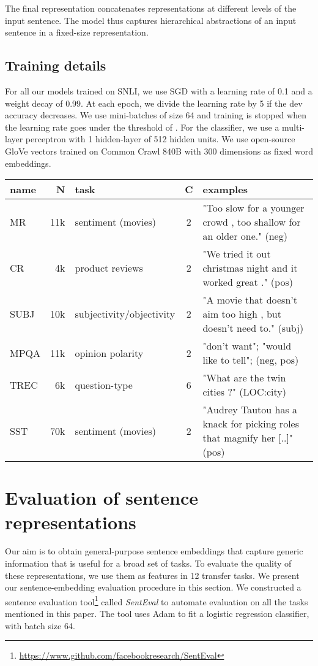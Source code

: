 \documentclass[11pt,letterpaper]{article}
\begin{document}
The final representation  concatenates representations at different levels of the input sentence. The model thus captures hierarchical abstractions of an input sentence in a fixed-size representation.

\subsection{Training details}
For all our models trained on SNLI, we use SGD with a learning rate of 0.1 and a weight decay of 0.99. At each epoch, we divide the learning rate by 5 if the dev accuracy decreases. We use mini-batches of size 64 and training is stopped when the learning rate goes under the threshold of . For the classifier, we use a multi-layer perceptron with 1 hidden-layer of 512 hidden units. We use open-source GloVe vectors trained on Common Crawl 840B with 300 dimensions as fixed word embeddings.

\begin{table*}[h!]
{\small
\centering
\begin{tabular}{|l|r|l|c|p{9.2cm}|}
\hline \bf name & \bf N & \bf task & \bf C & \bf examples \\
\hline
MR & 11k &  sentiment (movies) & 2 &  "Too slow for a younger crowd , too shallow for an older one." (neg)\\
CR & 4k &  product reviews & 2 & "We tried it out christmas night and it worked great ." (pos)\\
SUBJ & 10k & subjectivity/objectivity & 2 &  "A movie that doesn't aim too high , but doesn't need to." (subj) \\
MPQA & 11k &  opinion polarity & 2 & "don't want";  "would like to tell"; (neg, pos)\\
TREC & 6k & question-type & 6 &  "What are the twin cities ?" (LOC:city)\\
SST & 70k &  sentiment (movies) &  2 & "Audrey Tautou has a knack for picking roles that magnify her [..]" (pos) \\
\hline
\end{tabular}
\caption{\label{table:classif} {\bf Classification tasks}. C is the number of class and N is the number of samples.}

}\end{table*}

\section{Evaluation of sentence representations}
Our aim is to obtain general-purpose sentence embeddings that capture generic information that is useful for a broad set of tasks. To evaluate the quality of these representations, we use them as features in 12 transfer tasks. We present our sentence-embedding evaluation procedure in this section.
We constructed a sentence evaluation tool\footnote{\url{https://www.github.com/facebookresearch/SentEval}} called \textit{SentEval} \cite{conneau2018senteval} to automate evaluation on all the tasks mentioned in this paper. The tool uses Adam \cite{kingma2014adam} to fit a logistic regression classifier, with batch size 64.
\end{document}
